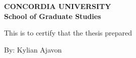 \documentclass[12pt, oneside]{report}   	%
\begin{document}

\cleardoublepage %
\thispagestyle{empty} %
\begin{center}
\textbf{CONCORDIA UNIVERSITY} \\

\textbf{School of Graduate Studies} \\
\end{center}

\vspace{0.5cm}

\noindent This is to certify that the thesis prepared

\vspace{0.5cm}

\noindent By:\indent \hspace{\parindent} Kylian Ajavon 
\end{document}
